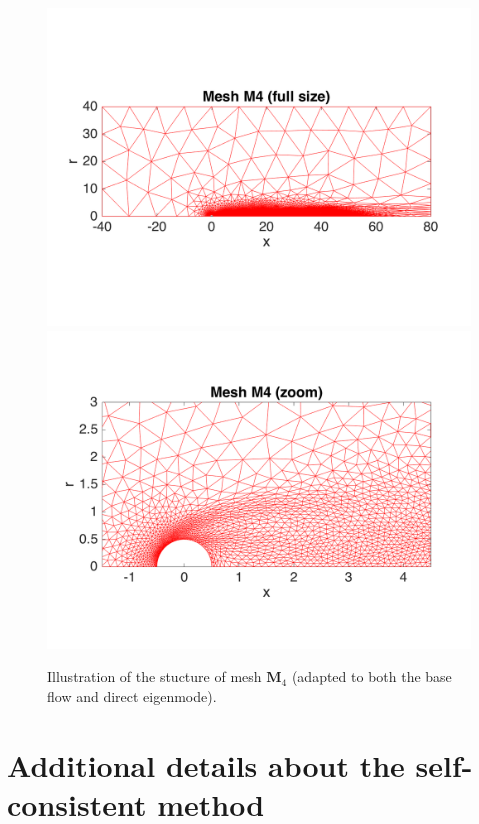 \documentclass[twocolumn,10pt]{asme2ej}
\begin{document}
\begin{figure}
\vspace{-.5cm}\vspace{-.5cm}
\includegraphics[width = .9\linewidth]{Cylinder_Mesh4_Full.png}
\vspace{-.5cm}\vspace{-.5cm}
\includegraphics[width = .9\linewidth]{Cylinder_Mesh4.png}
\caption{Illustration of the stucture of mesh  $\mathbf{M}_4$ (adapted to both the base flow and direct eigenmode).}
\label{fig:mesh4}
\end{figure}



\section{Additional details about the self-consistent method}
\end{document}
